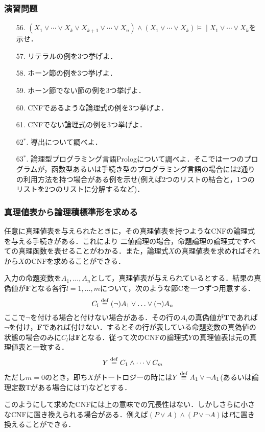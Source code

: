\documentclass{ltjsarticle}
\theoremstyle{mystyle1}
\theoremstyle{mystyle2}
\newcommand{\bT}{\ensuremath{\mathbf{T}}}
\newcommand{\bF}{\ensuremath{\mathbf{F}}}
\newcommand{\dequal}{\ensuremath{\stackrel{\rm{def}}{=}}}
\newcommand{\dequiv}{\ensuremath{\stackrel{\rm{def}}{\equiv}}}
\newcommand{\lequiv}{\ensuremath{\models\!\mid}}
\newcommand{\red}[1]{{\color{red} #1}}
\begin{document}
\subsubsection*{演習問題}
\begin{enumerate}
  \item[56.] $(X_1\vee\cdots\vee X_k\vee X_{k+1} \vee\cdots\vee X_n)\wedge(X_1\vee\cdots\vee X_k)\lequiv X_1\vee\cdots\vee X_k$を示せ．
  \item[57.] リテラルの例を3つ挙げよ．
  \item[58.] ホーン節の例を3つ挙げよ．
  \item[59.] ホーン節でない節の例を3つ挙げよ．
  \item[60.] CNFであるような論理式の例を3つ挙げよ．
  \item[61.] CNFでない論理式の例を3つ挙げよ．
  \item[62$^\ast$.] 導出について調べよ．
  \item[63$^\ast$.] 論理型プログラミング言語Prologについて調べよ．そこでは一つのプログラムが，函数型あるいは手続き型のプログラミング言語の場合には2通りの利用方法を持つ場合がある例を示せ(例えば2つのリストの結合と，1つのリストを2つのリストに分解するなど)．
\end{enumerate}
\subsubsection{真理値表から論理積標準形を求める}
任意に真理値表を与えられたときに，その真理値表を持つようなCNFの論理式を与える手続きがある．これにより\red{二値論理の場合，命題論理の論理式ですべての真理函数を表せる}ことがわかる．また，論理式$X$の真理値表を求めればそれから$X$のCNFを求めることができる．

入力の命題変数を$A_1,\ldots,A_n$として，真理値表が与えられているとする．結果の真偽値が$\bF$となる各行$l = 1, \ldots, m$について，次のような節Cを一つずつ用意する．
\[C_l\dequal (\neg)A_1\vee\ldots\vee(\neg)A_n\]
ここで$\neg$を付ける場合と付けない場合がある．その行の$A_i$の真偽値が$\bT$であれば$\neg$を付け，$\bF$であれば付けない．するとその行が表している命題変数の真偽値の状態の場合のみに$C_l$は$\bF$となる．従って次のCNFの論理式$Y$の真理値表は元の真理値表と一致する．
\[Y \dequal C_1\wedge\cdots\vee C_m\]
ただし$m=0$のとき，即ち$X$がトートロジーの時には$Y\dequiv A_1\vee\neg A_1$(あるいは論理定数Tがある場合にはT)などとする．

このようにして求めたCNFには上の意味での冗長性はない．しかしさらに小さなCNFに置き換えられる場合がある．例えば$(P\vee A)\wedge(P\vee\neg A)$は$P$に置き換えることができる．
\end{document}
